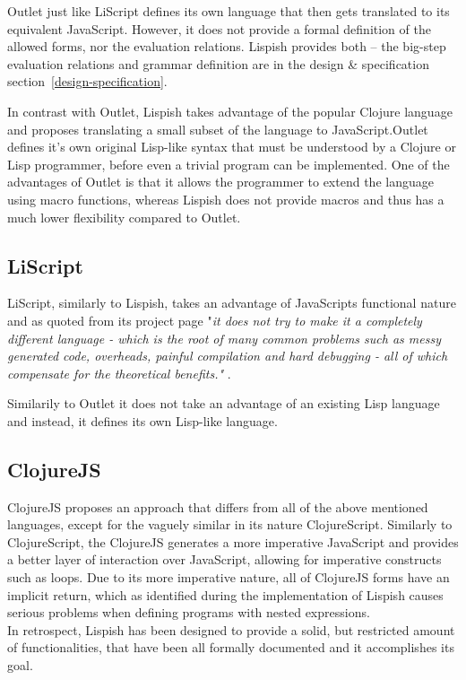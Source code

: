 Outlet just like LiScript defines its own language that then gets translated to its equivalent JavaScript. However, it does not provide a formal definition of the allowed forms, nor the evaluation relations. Lispish provides both -- the big-step evaluation relations and grammar definition are in the design \& specification section~\ref{design-specification}.

In contrast with Outlet, Lispish takes advantage of the popular Clojure language and proposes translating a small subset of the language to JavaScript.Outlet defines it's own original Lisp-like syntax that must be understood by a Clojure or Lisp programmer, before even a trivial program can be implemented.
One of the advantages of Outlet is that it allows the programmer to extend the language using macro functions, whereas Lispish does not provide macros and thus has a much lower flexibility compared to Outlet.

\subsection{LiScript}

LiScript, similarly to Lispish, takes an advantage of JavaScripts functional nature and as quoted from its project page "\textit{it does not try to make it a completely different language - which is the root of many common problems such as messy generated code, overheads, painful compilation and hard debugging - all of which compensate for the theoretical benefits."} \cite{LiScript:2013:Site}.

Similarily to Outlet it does not take an advantage of an existing Lisp language and instead, it defines its own Lisp-like language. 

\subsection{ClojureJS}

ClojureJS proposes an approach that differs from all of the above mentioned languages, except for the vaguely similar in its nature ClojureScript. Similarly to ClojureScript, the ClojureJS generates a more imperative JavaScript and provides a better layer of interaction over JavaScript, allowing for imperative constructs such as loops. 
Due to its more imperative nature, all of ClojureJS forms have an implicit return, which as identified during the implementation of Lispish causes serious problems when defining programs with nested expressions. \\

In retrospect, Lispish has been designed to provide a solid, but restricted amount of functionalities, that have been all formally documented and it accomplishes its goal.

